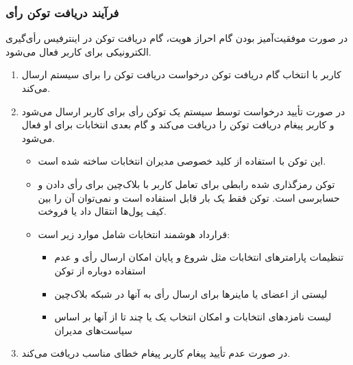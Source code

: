 \documentclass[12pt]{article}
\begin{document}
\subsubsection{فرآیند دریافت توکن رأی}
در صورت موفقیت‌آمیز بودن گام احراز هویت، گام دریافت توکن در اینترفیس رأی‌گیری الکترونیکی برای کاربر فعال می‌شود. 
\begin{enumerate}[label=(\arabic*)]
\item
کاربر با انتخاب  گام دریافت توکن درخواست دریافت توکن را برای سیستم ارسال می‌کند. 
\item
در صورت تأیید درخواست توسط سیستم یک توکن رأی برای کاربر ارسال می‌شود و کاربر پیغام دریافت توکن را دریافت می‌کند و گام بعدی انتخابات برای او فعال می‌شود. 
\begin{itemize}
\item
 این توکن با استفاده از کلید خصوصی مدیران انتخابات ساخته شده است. 
\item
توکن رمزگذاری شده رابطی برای تعامل کاربر با بلاک‌چین برای رأی دادن و حسابرسی است. توکن فقط یک بار قابل استفاده است و نمی‌توان آن را بین کیف پول‌ها انتقال داد یا فروخت. 
\item
قرارداد هوشمند انتخابات شامل موارد زیر است:
\begin{itemize}
\item
 تنظیمات پارامترهای انتخابات مثل شروع و پایان امکان ارسال رأی و عدم استفاده دوباره از توکن
 \item
 لیستی از اعضای 
 یا ماینرها برای ارسال رأی به آنها در شبکه بلاک‌چین 
 \item
 لیست نامزدهای انتخابات و امکان انتخاب یک یا چند تا از آنها بر اساس سیاست‌های مدیران 
 \end{itemize}
\end{itemize}
\item
در صورت عدم تأیید پیغام کاربر پیغام خطای مناسب دریافت می‌کند. 
\end{enumerate}
\end{document}
